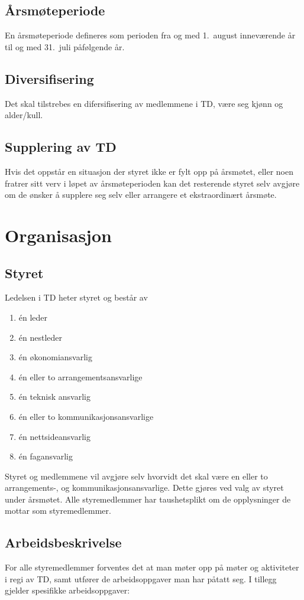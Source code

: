 \documentclass[11pt]{article}
\begin{document}
\subsection{Årsmøteperiode}
En årsmøteperiode defineres som perioden fra og med 1.\ august inneværende år til og med 31.\ juli påfølgende år.

\subsection{Diversifisering}
Det skal tilstrebes en difersifisering av medlemmene i TD, være seg kjønn og alder/kull.

\subsection{Supplering av TD}
Hvis det oppstår en situasjon der styret ikke er fylt opp på årsmøtet, eller noen fratrer sitt verv i løpet av årsmøteperioden kan det resterende styret selv avgjøre om de ønsker å supplere seg selv eller arrangere et ekstraordinært årsmøte.

\section{Organisasjon}
\subsection{Styret}
Ledelsen i TD heter styret og består av
\begin{enumerate}
	\item én leder
	\item én nestleder
	\item én økonomiansvarlig
	\item én eller to arrangementsansvarlige
	\item én teknisk ansvarlig
	\item én eller to kommunikasjonsansvarlige 
	\item én nettsideansvarlig
    \item én fagansvarlig
\end{enumerate}

Styret og medlemmene vil avgjøre selv hvorvidt det skal være en eller to arrangements-, og kommunikasjonsansvarlige. Dette gjøres ved valg av styret under årsmøtet. Alle styremedlemmer har taushetsplikt om de opplysninger de mottar som styremedlemmer.

\subsection{Arbeidsbeskrivelse}
For alle styremedlemmer forventes det at man møter opp på møter og aktiviteter i regi av TD, samt utfører de arbeidsoppgaver man har påtatt seg. I tillegg gjelder spesifikke arbeidsoppgaver:
\end{document}
